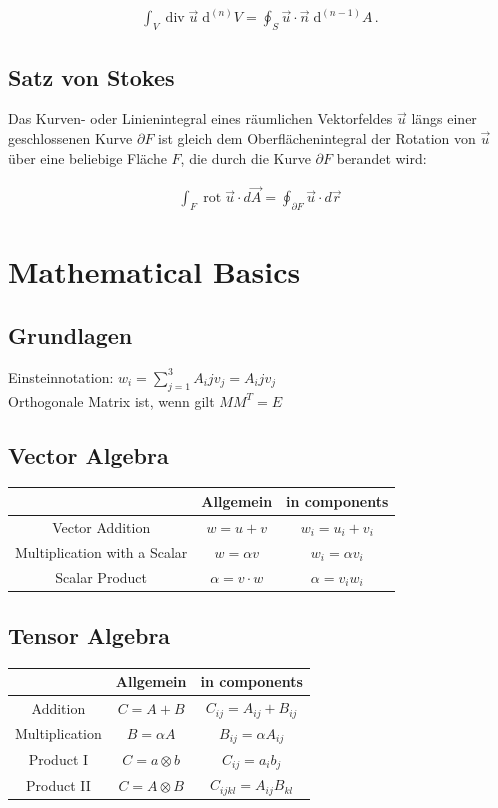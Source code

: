 \documentclass[a4paper]{scrartcl}
\begin{document}
\begin{align}
\int_V \operatorname{div} \vec u \; \mathrm d^{(n)}V = \oint_{S} \vec u \cdot
\vec n\; \mathrm d^{(n-1)}A\,.
\end{align}
\subsection{Satz von Stokes}
Das Kurven- oder Linienintegral eines räumlichen Vektorfeldes $\vec u$ längs
einer geschlossenen Kurve $\partial F$ ist gleich dem Oberflächenintegral der
Rotation von $\vec u$ über eine beliebige Fläche $F$, die durch die Kurve
$\partial F$ berandet wird:

\begin{align}
 \int_{F} \operatorname{rot} \vec u \cdot d \vec A =
\oint_{\partial F} \vec u \cdot d \vec r
\end{align}


\section{Mathematical Basics}
\subsection{Grundlagen}


Einsteinnotation: $w_i=\sum_{j=1}^{3}A_ijv_j=A_ijv_j$
\\
Orthogonale Matrix ist, wenn gilt $MM^T=E$
\\


\subsection{Vector Algebra}
\begin{tabular}{|c|c|c|}
\hline  & Allgemein & in components \\ 
\hline Vector Addition & $w=u+v$ & $w_i=u_i+v_i$ \\ 
\hline Multiplication with a Scalar & $w=\alpha v$ & $w_i=\alpha v_i$ \\ 
\hline Scalar Product & $\alpha = v \cdot w $ & $\alpha = v_i w_i$ \\ 
\hline 
\end{tabular} 

\subsection{Tensor Algebra}
\begin{tabular}{|c|c|c|}
\hline  & Allgemein & in components \\ 
\hline Addition & $C=A+B$ & $C_{ij}=A_{ij}+B_{ij}$ \\ 
\hline Multiplication& $B=\alpha A$ & $B_{ij}=\alpha A_{ij}$ \\ 
\hline Product I & $C = a \otimes b $ & $C_{ij} = a_i b_j$ \\ 
\hline Product II& $C = A \otimes B $ & $C_{ijkl} = A_{ij} B_{kl}$ \\
\hline 
\end{tabular} 
\end{document}
